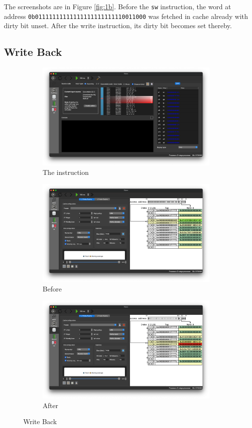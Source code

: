 \documentclass[12pt, a4paper]{article}
\begin{document}
The screenshots are in Figure \ref{fig:1b}. Before the \texttt{sw} instruction, the word at address \texttt{0b01111111111111111111111110011000} was fetched in cache already with dirty bit unset. After the write instruction, its dirty bit becomes set thereby.

\subsection{Write Back}

\begin{figure}[htbp]
\begin{subfigure}{\linewidth}
\centering
\includegraphics[width=.69\linewidth]{c}
\caption{The instruction}
\end{subfigure}
\begin{subfigure}{\linewidth}
\centering
\includegraphics[width=.807\linewidth]{c0}
\caption{Before}
\label{fig:1c0}
\end{subfigure}
\begin{subfigure}{\linewidth}
\centering
\includegraphics[width=.807\linewidth]{c1}
\caption{After}
\label{fig:1c1}
\end{subfigure}
\caption{Write Back}
\label{fig:1c}
\end{figure}
\end{document}
